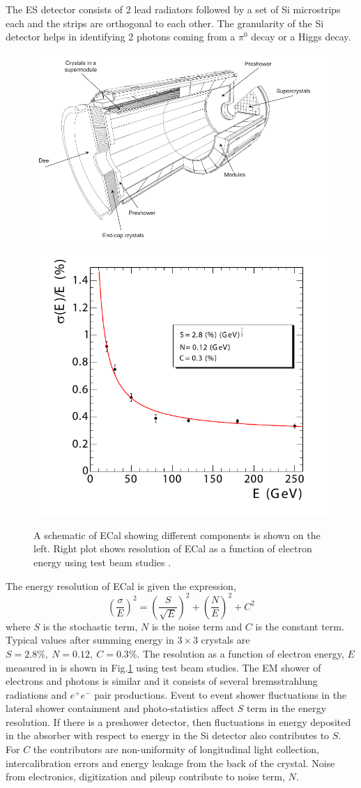 The ES detector consists of 2 lead radiators followed by a set of Si microstrips each and the strips are orthogonal to each other.
The granularity of the Si detector helps in identifying 2 photons coming from a $\pi^0$ decay or a Higgs decay.
\begin{figure}[h!]
\centering
\includegraphics[width=0.59\linewidth]{../Figures/Chap2/Ecal_schematic}
\includegraphics[width=0.4\linewidth]{../Figures/Chap2/ecalResolution}
\captionsetup{width=.95\linewidth}
\caption[ECal schematic and resolution]{A schematic of ECal showing different components is shown on the left. 
Right plot shows resolution of ECal as a function of electron energy using test beam studies \cite{Chatrchyan:2008aa}.}
\label{fig:Ecal_sche_res}
\end{figure}

\noindent The energy resolution of ECal is given the expression,
\begin{equation}
\label{eqn:ecalReso}
{\left(\frac{\sigma}{E}\right)}^2  =  {\left(\frac{S}{\sqrt{E}}\right)}^2 + {\left(\frac{N}{E}\right)}^2 + C^2
\end{equation}
where $S$ is the stochastic term, $N$ is the noise term and $C$ is the constant term. Typical values after summing energy in $3\times3$ 
crystals are $S=2.8\%,\ N=0.12,\ C=0.3\%$. The resolution as a function of electron energy, $E$ measured in \gev is shown in 
Fig.\ref{fig:Ecal_sche_res} using test beam studies. The EM shower of electrons and photons is similar and it consists of several 
bremsstrahlung radiations and $e^+e^-$ pair productions. Event to event shower fluctuations in the lateral shower containment and
photo-statistics affect $S$ term in the energy resolution. If there is a preshower detector, then fluctuations in energy deposited in the 
absorber with respect to energy in the Si detector also contributes to $S$. For $C$ the contributors are non-uniformity of longitudinal 
light collection, intercalibration errors and energy leakage from the back of the crystal. Noise from electronics, digitization and pileup 
contribute to noise term, $N$.

